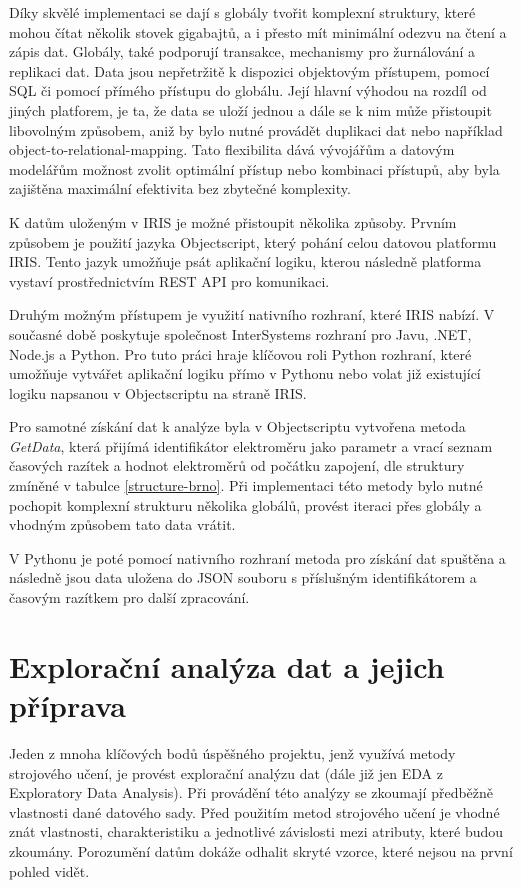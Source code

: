 \documentclass[FM,BP,fonts]{tulthesis}
\begin{document}
Díky skvělé implementaci se dají s globály tvořit komplexní struktury, které mohou čítat několik stovek gigabajtů, a i přesto mít minimální odezvu na čtení a zápis dat. \cite{irisPlatform} Globály, také podporují transakce, mechanismy pro žurnálování a replikaci dat. Data jsou nepřetržitě k dispozici  objektovým přístupem, pomocí SQL či pomocí přímého přístupu do globálu. Její hlavní výhodou na rozdíl od jiných platforem, je ta, že data se uloží jednou a dále se k nim může přistoupit libovolným způsobem, aniž by bylo nutné provádět duplikaci dat nebo například object-to-relational-mapping. \cite{irisPlatform} Tato flexibilita dává vývojářům a datovým modelářům možnost zvolit optimální přístup nebo kombinaci přístupů, aby byla zajištěna maximální efektivita bez zbytečné komplexity.

K datům uloženým v IRIS je možné přistoupit několika způsoby. Prvním způsobem je použití jazyka Objectscript, který pohání celou datovou platformu IRIS. Tento jazyk umožňuje psát aplikační logiku, kterou následně platforma vystaví prostřednictvím REST API pro komunikaci.

Druhým možným přístupem je využití nativního rozhraní, které IRIS nabízí. V současné době poskytuje společnost InterSystems rozhraní pro Javu, .NET, Node.js a Python.\cite{irisPlatform} Pro tuto práci hraje klíčovou roli Python rozhraní, které umožňuje vytvářet aplikační logiku přímo v Pythonu nebo volat již existující logiku napsanou v Objectscriptu na straně IRIS.

Pro samotné získání dat k analýze byla v Objectscriptu vytvořena metoda \textit{GetData}, která přijímá identifikátor elektroměru jako parametr a vrací seznam časových razítek a hodnot elektroměrů od počátku zapojení, dle struktury zmíněné v tabulce \ref{structure-brno}. Při implementaci této metody bylo nutné pochopit komplexní strukturu několika globálů, provést iteraci přes globály a vhodným způsobem tato data vrátit. 

V Pythonu je poté pomocí nativního rozhraní metoda pro získání dat spuštěna a následně jsou data uložena do JSON souboru s příslušným identifikátorem a časovým razítkem pro další zpracování.  



\section{Explorační analýza dat a jejich příprava}
Jeden z mnoha klíčových bodů úspěšného projektu, jenž využívá metody strojového učení, je provést explorační analýzu dat (dále již jen EDA z Exploratory Data Analysis). Při provádění této analýzy se zkoumají předběžně vlastnosti dané datového sady. Před použitím metod strojového učení je vhodné znát vlastnosti, charakteristiku a jednotlivé závislosti mezi atributy, které budou zkoumány. Porozumění datům dokáže odhalit skryté vzorce, které nejsou na první pohled vidět.
\end{document}
